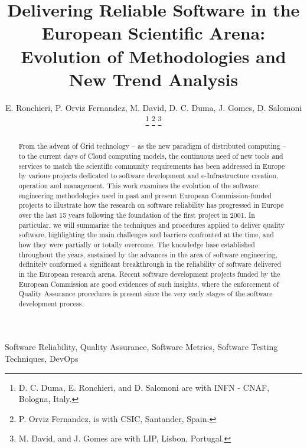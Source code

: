 \documentclass[journal]{IEEEtran}
\begin{document}
\title{Delivering Reliable Software in the European Scientific Arena: Evolution of Methodologies and New Trend Analysis}

\author{E. Ronchieri,
        P. Orviz Fernandez,
        M. David,
	D. C. Duma,
        J. Gomes,
        D. Salomoni
\thanks{D. C. Duma, E. Ronchieri, and D. Salomoni are with INFN - CNAF, Bologna, Italy.}
\thanks{P. Orviz Fernandez, is with CSIC, Santander, Spain.}
\thanks{M. David, and J. Gomes are with LIP, Lisbon, Portugal.}%
}


\maketitle

\begin{abstract}
From the advent of Grid technology -- as the new paradigm of distributed
computing -- to the current days of Cloud computing models, the continuous need
of new tools and services to match the scientific community requirements has been
addressed in Europe by various projects dedicated to software development
and e-Infrastructure creation, operation and management.
This work examines the evolution of the software engineering methodologies used in past and
present European Commission-funded projects to illustrate how the research on software
reliability has progressed in Europe over the last 15 years following the foundation of the
first project in 2001. In particular, we will summarize the techniques and procedures
applied to deliver quality software, highlighting the main challenges and barriers confronted
at the time, and how they were partially or totally overcome. The knowledge base established
throughout the years, sustained by the advances in the area of software engineering,
definitely conformed a significant breakthrough in the reliability of software delivered in the
European research arena. Recent software development projects funded by the European
Commission are good evidences of such insights, where the enforcement of Quality Assurance
procedures is present since the very early stages of the software development process.
\end{abstract}

\begin{IEEEkeywords}
Software Reliability, Quality Assurance, Software Metrics, Software Testing
Techniques, DevOps
\end{IEEEkeywords}
\end{document}
